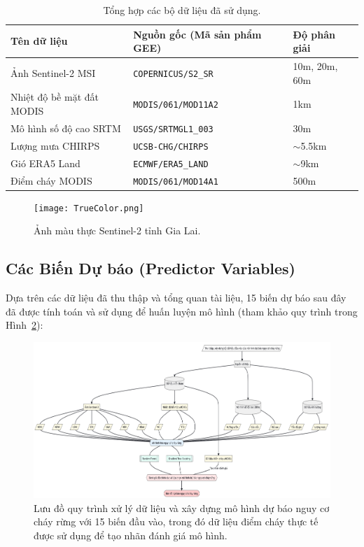 \documentclass{article}
\begin{document}
\begin{table}[H]
\centering
\caption{Tổng hợp các bộ dữ liệu đã sử dụng.}
\label{tab:tong_hop_du_lieu}
\begin{tabular}{p{5cm}p{5cm}p{3cm}} %
\toprule %
\textbf{Tên dữ liệu} & \textbf{Nguồn gốc (Mã sản phẩm GEE)} & \textbf{Độ phân giải} \\
\midrule %
Ảnh Sentinel-2 MSI & \texttt{COPERNICUS/S2\_SR} & 10m, 20m, 60m \\
Nhiệt độ bề mặt đất MODIS & \texttt{MODIS/061/MOD11A2} & 1km \\
Mô hình số độ cao SRTM & \texttt{USGS/SRTMGL1\_003} & 30m \\
Lượng mưa CHIRPS & \texttt{UCSB-CHG/CHIRPS} & $\sim$5.5km \\
Gió ERA5 Land & \texttt{ECMWF/ERA5\_LAND} & $\sim$9km \\
Điểm cháy MODIS & \texttt{MODIS/061/MOD14A1} & 500m \\
\bottomrule %
\end{tabular}
\end{table}

\begin{figure}[H]
\centering
\texttt{[image: TrueColor.png]}
\caption{Ảnh màu thực Sentinel-2 tỉnh Gia Lai.}
\label{fig:anh_mau_thuc_sentinel2}
\end{figure}
\FloatBarrier

\subsection{Các Biến Dự báo (Predictor Variables)} %
Dựa trên các dữ liệu đã thu thập và tổng quan tài liệu, 15 biến dự báo sau đây đã được tính toán và sử dụng để huấn luyện mô hình (tham khảo quy trình trong Hình~\ref{fig:luu_do_quy_trinh}):

\begin{figure}[H]
\centering
\includegraphics[width=1\textwidth]{flowchart.png}
\caption{Lưu đồ quy trình xử lý dữ liệu và xây dựng mô hình dự báo nguy cơ cháy rừng với 15 biến đầu vào, trong đó dữ liệu điểm cháy thực tế được sử dụng để tạo nhãn đánh giá mô hình.}
\label{fig:luu_do_quy_trinh}
\end{figure}
\FloatBarrier
\end{document}
